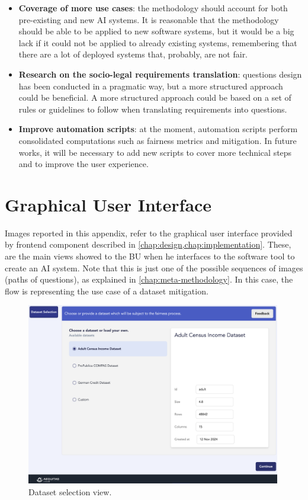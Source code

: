 \documentclass[12pt,a4paper,openright,twoside]{book}
\begin{document}
\begin{itemize}
    \item \textbf{Coverage of more use cases}: the methodology should account for both pre-existing and new \ac{AI} systems.
    It is reasonable that the methodology should be able to be applied to new software systems, but it would be a big lack if it could not be applied to already existing systems, remembering that there are a lot of deployed systems that, probably, are not fair.

    \item \textbf{Research on the socio-legal requirements translation}: questions design has been conducted in a pragmatic way, but a more structured approach could be beneficial.
    A more structured approach could be based on a set of rules or guidelines to follow when translating requirements into questions.

    \item \textbf{Improve automation scripts}: at the moment, automation scripts perform consolidated computations such as fairness metrics and mitigation.
    In future works, it will be necessary to add new scripts to cover more technical steps and to improve the user experience.
\end{itemize}


\appendix


\chapter{Graphical User Interface}\label{app:gui}

Images reported in this appendix, refer to the graphical user interface provided by frontend component described in \cref{chap:design,chap:implementation}.
%
These, are the main views showed to the \ac{BU} when he interfaces to the software tool to create an AI system.
%
Note that this is just one of the possible sequences of images (paths of questions), as explained in \cref{chap:meta-methodology}.
%
In this case, the flow is representing the use case of a dataset mitigation.

\begin{figure}
    \centering
    \includegraphics[width=0.99\textwidth]{figures/gui/dataset-selection.png}
    \caption{Dataset selection view.}
    \label{fig:dataset-selection}
\end{figure}
\end{document}
